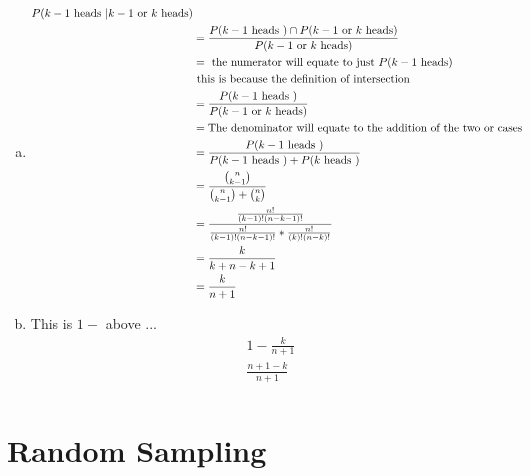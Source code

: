 \documentclass[10pt]{report}
\begin{document}
\subsection{}
 \begin{enumerate}[(a)]
 \item \begin{align*}
 P(k -1 \textnormal{ heads } | k-1 \textnormal{ or } k \textnormal{ heads}) \\
 &= \frac{P(k-1 \textnormal{ heads }) \cap P(k-1 \textnormal{ or } k \textnormal{ heads})}{P(k-1 \textnormal{ or } k \textnormal{ heads})}\\
 &= \textnormal{ the numerator will equate to just } P(k-1 \textnormal{ heads})\\ &\textnormal{ this is because the definition of intersection} \\
 &= \frac{P(k-1 \textnormal{ heads })}{P(k-1 \textnormal{ or } k \textnormal{ heads})}\\
 &= \textnormal{The denominator will equate to the addition of the two or cases} \\
&= \frac{P(k-1 \textnormal{ heads })}{P(k-1 \textnormal{ heads }) + P(k \textnormal{ heads } )} \\
&= \frac{\binom{n}{k-1}}{\binom{n}{k-1} + \binom{n}{k}} \\
&= \frac{\frac{n!}{(k-1)!(n-k-1)!}}{\frac{n!}{(k-1)!(n-k-1)!} * \frac{n!}{(k)!(n-k)!}} \\
&= \frac{k}{k+n-k+1} \\
&= \frac{k}{n+1} \\
 \end{align*}
 \item This is $1 - $ above ... \ \\
 \begin{align*}
 1 - \frac{k}{n+1} \\
 \frac{n+1-k}{n+1} \\
 \end{align*}
 \end{enumerate}
 \setcounter{section}{4}
\section{\sc\color{cit}Random Sampling}
\setcounter{subsection}{1}
\end{document}
